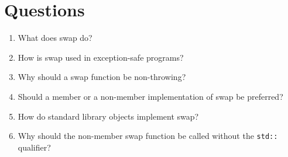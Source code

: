 \section{Questions}

\begin{enumerate}
\item
  What does swap do?
\item
  How is swap used in exception-safe programs?
\item
  Why should a swap function be non-throwing?
\item
  Should a member or a non-member implementation of swap be preferred?
\item
  How do standard library objects implement swap?
\item
  Why should the non-member swap function be called without the \texttt{std::} qualifier?
\end{enumerate}

